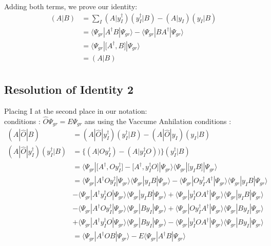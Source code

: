 \documentclass[11pt, oneside]{article}   	%
\begin{document}
    Adding both terms, we prove our identity:
    \begin{equation*}\label{eq:resolution of identity}
      \begin{aligned}
        (A|B)&=\sum_I (A|y_I^\dagger)(y_I^\dagger|B)-(A|y_I)(y_I|B)\\
	&=\big \langle \Psi_{gr}| A^\dagger B|\Psi_{gr} \big \rangle -\big \langle \Psi_{gr}|B A^\dagger |\Psi_{gr} \big \rangle \\
	&=\big \langle \Psi_{gr}|\big[A^\dagger,B\big] |\Psi_{gr} \big \rangle \\
	&=(A|B)\\
      \end{aligned}
    \end{equation*}

  \subsection{Resolution of Identity 2}
    Placing I at the second place in our notation:\\
    conditions : $\hat{O} \Psi_{gr} = E \Psi_{gr}$ ans using the Vaccume Anhilation conditions :\\
    \begin{equation*}\label{eq:resolution of identity 2}
      \begin{aligned}
	(A|\hat{O}|B)&=(A|\hat{O}|y_I^\dagger)(y_I^\dagger|B)-(A|\hat{O}|y_I)(y_I|B)\\
	(A|\hat{O}|y_I^\dagger)(y_I^\dagger|B)&=\{(A|O y_I^\dagger)-(A|y_I^\dagger O))\}(y_I^\dagger|B)\\
			&= \big \langle \Psi_{gr}|\big[A^\dagger,O y_I^\dagger\big]-\big[A^\dagger, y_I^\dagger O \big]|\Psi_{gr} \big \rangle \big \langle \Psi_{gr}|\big[ y_I B\big]|\Psi_{gr} \big \rangle\\
			&= \big \langle \Psi_{gr}|A^\dagger O y_I^\dagger|\Psi_{gr} \big \rangle \big \langle \Psi_{gr}|y_I B|\Psi_{gr} \big \rangle 
			- \big \langle \Psi_{gr}|O y_I^\dagger A^\dagger|\Psi_{gr} \big \rangle \big \langle \Psi_{gr}|y_I B|\Psi_{gr} \big \rangle\\
			&   - \big \langle \Psi_{gr}|A^\dagger y_I^\dagger O|\Psi_{gr} \big \rangle \big \langle \Psi_{gr}|y_I B|\Psi_{gr} \big \rangle
			+ \big \langle \Psi_{gr}| y_I^\dagger O A^\dagger|\Psi_{gr} \big \rangle \big \langle \Psi_{gr}|y_I B|\Psi_{gr} \big \rangle\\
			&- \big \langle \Psi_{gr}|A^\dagger O y_I^\dagger|\Psi_{gr} \big \rangle \big \langle \Psi_{gr}|B y_I|\Psi_{gr} \big \rangle 
			+ \big \langle \Psi_{gr}|O y_I^\dagger A^\dagger|\Psi_{gr} \big \rangle \big \langle \Psi_{gr}|B y_I|\Psi_{gr} \big \rangle\\
			&+ \big \langle \Psi_{gr}|A^\dagger y_I^\dagger O|\Psi_{gr} \big \rangle \big \langle \Psi_{gr}|B y_I|\Psi_{gr} \big \rangle
			- \big \langle \Psi_{gr}| y_I^\dagger O A^\dagger|\Psi_{gr} \big \rangle \big \langle \Psi_{gr}|B y_I|\Psi_{gr} \big \rangle\\
			&=\big \langle \Psi_{gr}|A^\dagger O B|\Psi_{gr} \big \rangle - E \big \langle \Psi_{gr}|A^\dagger B|\Psi_{gr} \big \rangle
      \end{aligned}
    \end{equation*}
\end{document}
